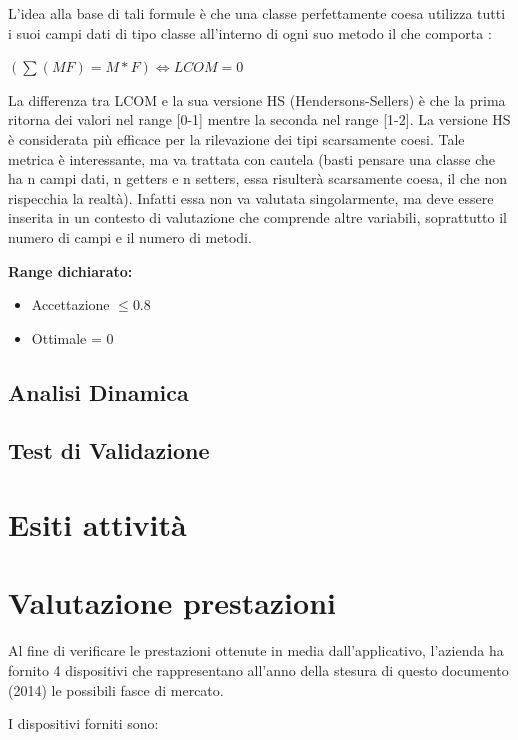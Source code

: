 L'idea alla base di tali formule è che una classe perfettamente coesa utilizza tutti i
suoi campi dati di tipo classe all'interno di ogni suo metodo il che comporta :

\begin{center}
 $(\sum(MF) = M \ast F) \Leftrightarrow LCOM = 0 $
\end{center}



La differenza tra LCOM e la sua versione HS (Hendersons-Sellers) è che la prima
ritorna dei valori nel range [0-1] mentre la seconda nel range [1-2]. La versione HS è
considerata più efficace per la rilevazione dei tipi scarsamente coesi.
Tale metrica è interessante, ma va trattata con cautela (basti pensare una classe
che ha n campi dati, n getters e n setters, essa risulterà scarsamente coesa, il che
non rispecchia la realtà). Infatti essa non va valutata singolarmente, ma deve essere
inserita in un contesto di valutazione che comprende altre variabili, soprattutto il
numero di campi e il numero di metodi. 

\textbf{Range dichiarato:}
\begin{itemize}
\item Accettazione $\leq 0.8$
\item Ottimale = 0
\end{itemize}


\subsection{Analisi Dinamica}
\subsection{Test di Validazione}

\section{Esiti attività}

\section{Valutazione prestazioni}

Al fine di verificare le prestazioni ottenute in media dall'applicativo, l'azienda ha fornito 4 dispositivi che rappresentano all'anno della stesura di questo documento (2014) le possibili fasce di mercato.

I dispositivi forniti sono:

